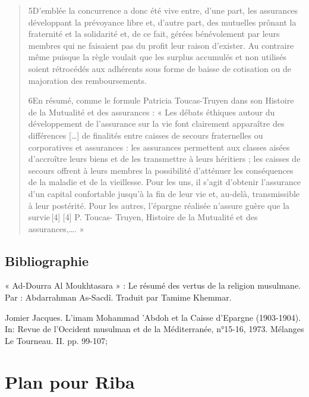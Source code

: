 \begin{quote}
5D’emblée la concurrence a donc été vive entre, d’une part, les assurances développant la prévoyance libre et, d’autre part, des mutuelles prônant la fraternité et la solidarité et, de ce fait, gérées bénévolement par leurs membres qui ne faisaient pas du profit leur raison d’exister. Au contraire même puisque la règle voulait que les surplus accumulés et non utilisés soient rétrocédés aux adhérents sous forme de baisse de cotisation ou de majoration des remboursements.

6En résumé, comme le formule Patricia Toucas-Truyen dans son Histoire de la Mutualité et des assurances : « Les débats éthiques autour du développement de l’assurance sur la vie font clairement apparaître des différences […] de finalités entre caisses de secours fraternelles ou corporatives et assurances : les assurances permettent aux classes aisées d’accroître leurs biens et de les transmettre à leurs héritiers ; les caisses de secours offrent à leurs membres la possibilité d’atténuer les conséquences de la maladie et de la vieillesse. Pour les uns, il s’agit d’obtenir l’assurance d’un capital confortable jusqu’à la fin de leur vie et, au-delà, transmissible à leur postérité. Pour les autres, l’épargne réalisée n’assure guère que la survie [4]
[4]
P. Toucas- Truyen, Histoire de la Mutualité et des assurances,…. »
\end{quote}
 \section{Bibliographie}


« Ad-Dourra Al Moukhtasara » : Le résumé des vertus de la religion musulmane. Par : Abdarrahman As-Sacdî. Traduit par Tamime Khemmar.

Jomier Jacques. L'imam Mohammad 'Abdoh et la Caisse d'Epargne (1903-1904). In: Revue de l'Occident musulman et de la
Méditerranée, n°15-16, 1973. Mélanges Le Tourneau. II. pp. 99-107;

\cite{Chapra:Riba}

\chapter{Plan pour Riba}

